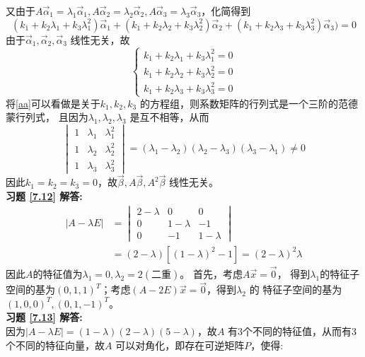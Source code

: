 \documentclass[a4paper]{book}
\begin{document}
又由于$A\vec{\alpha}_1=\lambda_1\vec{\alpha}_1,A\vec{\alpha}_2=\lambda_2\vec{\alpha}_2,A\vec{\alpha}_3=\lambda_3\vec{\alpha}_3$，化简得到
\begin{equation*}
  (k_1+k_2\lambda_1+k_3\lambda_1^2)\vec{\alpha}_1+
  (k_1+k_2\lambda_2+k_3\lambda_2^2)\vec{\alpha}_2+
  (k_1+k_2\lambda_3+k_3\lambda_3^2)\vec{\alpha}_3)=0
\end{equation*}
由于$\vec{\alpha}_1,\vec{\alpha}_2,\vec{\alpha}_3$ 线性无关，故
\begin{equation}\label{aa}
\begin{cases}
  k_1+k_2\lambda_1+k_3\lambda_1^2=0\\
  k_1+k_2\lambda_2+k_3\lambda_2^2=0\\
  k_1+k_2\lambda_3+k_3\lambda_3^2=0
\end{cases}
\end{equation}
将\eqref{aa}可以看做是关于$k_1,k_2,k_3$ 的方程组，则系数矩阵的行列式是一个三阶的范德蒙行列式，
且因为$\lambda_1,\lambda_2,\lambda_3$ 是互不相等，从而
\begin{equation*}
\begin{vmatrix}
  1&\lambda_1&\lambda_1^2\\
  1&\lambda_2&\lambda_2^2\\
  1&\lambda_3&\lambda_3^2
\end{vmatrix}=(\lambda_1-\lambda_2)(\lambda_2-\lambda_3)(\lambda_3-\lambda_1)\neq0
\end{equation*}
因此$k_1=k_2=k_3=0$，故$\vec{\beta},A\vec{\beta},A^2\vec{\beta}$ 线性无关。\\
\textbf{习题 \ref{7.12} 解答:}\\
\begin{align*}
  |A-\lambda E|&=\begin{vmatrix}2-\lambda&0&0\\0&1-\lambda&-1\\0&-1&1-\lambda\end{vmatrix}\\
   & =(2-\lambda)[(1-\lambda)^2-1]=(2-\lambda)^2\lambda
\end{align*}
因此$A$的特征值为$\lambda_1=0,\lambda_2=2(\text{二重})$。 首先，考虑$A\vec{x}=\vec{0}$，
得到$\lambda_1$的特征子空间的基为$(0,1,1)^T$；考虑$(A-2E)\vec{x}=\vec{0}$，得到$\lambda_2$ 的
特征子空间的基为$(1,0,0)^T,(0,1,-1)^T$。\\
\textbf{习题 \ref{7.13} 解答:}\\
因为$|A-\lambda E|=(1-\lambda)(2-\lambda)(5-\lambda)$，故$A$ 有3个不同的特征值，从而有3 个不同的特征向量，故$A$
可以对角化，即存在可逆矩阵$P$，使得:
\end{document}

